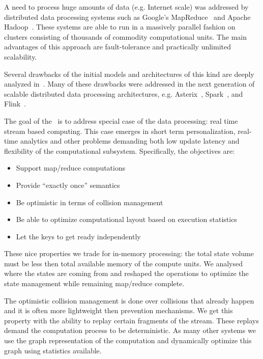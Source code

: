 
\label {fs-intro-seciton}

A need to process huge amounts of data (e.g. Internet scale) was addressed by distributed data processing systems such as Google's MapReduce~\cite{Dean:2008:MSD:1327452.1327492} and Apache Hadoop~\cite{hadoop}. These systems are able to run in a massively parallel fashion on clusters consisting of thousands of commodity computational units. The main advantages of this approach are fault-tolerance and practically unlimited scalability.

Several drawbacks of the initial models and architectures of this kind are deeply analyzed in~\cite{Doulkeridis:2014:SLA:2628707.2628782}. 
Many of these drawbacks were addressed in the next generation of scalable distributed data processing architectures, e.g. 
Asterix~\cite{Alsubaiee:2012:ASW:2331801.2331803}, 
Spark~\cite{Zaharia:2016:ASU:3013530.2934664,Franklin:2015:MSB:2684822.2685326}, 
and Flink~\cite{Carbone:2017:SMA:3137765.3137777}. 

The goal of the \FlameStream\ is to address special case of the data processing: real time stream based computing. This case emerges in short term personalization, real-time analytics and other problems demanding both low update latency and flexibility of the computational subsystem. Specifically, the objectives are:

\begin {itemize}
\item Support map/reduce computations
\item Provide ``exactly once'' semantics
\item Be optimistic in terms of collision management
\item Be able to optimize computational layout based on execution statistics
\item Let the keys to get ready independently
\end {itemize}

These nice properties we trade for in-memory processing: the total state volume must be less then total available memory of the compute units. We analysed where the states are coming from and reshaped the operations to optimize the state management while remaining map/reduce complete. 

The optimistic collision management is done over collisions that already happen and it is often more lightweight then prevention mechanisms. We get this property with the ability to replay certain fragments of the stream. These replays demand the computation process to be deterministic. As many other systems we use the graph representation of the computation and dynamically optimize this graph using statistics available. 

